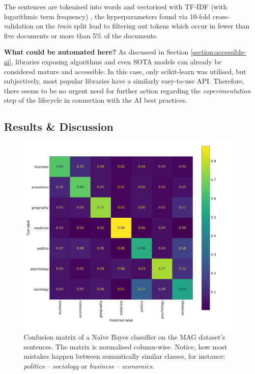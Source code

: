 The sentences are tokenised into words and vectorised with TF-IDF (with logarithmic term frequency) \cite{buckley1985implementation}, the hyperparameters found via 10-fold cross-validation on the \textit{train} split lead to filtering out tokens which occur in fewer than five documents or more than 5\% of the documents.

\begin{displayquote}
\textbf{What could be automated here?} As discussed in Section \ref{section:accessible-ai}, libraries exposing algorithms and even SOTA models can already be considered mature and accessible. In this case, only scikit-learn was utilised, but subjectively, most popular libraries have a similarly easy-to-use API. Therefore, there seems to be no urgent need for further action regarding the \textit{experimentation} step of the lifecycle in connection with the AI best practices.
\end{displayquote}

\subsection{Results \& Discussion}

\begin{figure}
    \centering
    \includegraphics[width=0.9\linewidth]{figures/mag-confusion.png}
    \captionsetup{width=.9\linewidth}
    \caption{Confusion matrix of a Naïve Bayes classifier on the MAG dataset's sentences. The matrix is normalised column-wise. Notice, how most mistakes happen between semantically similar classes, for instance: \textit{politics} -- \textit{sociology} or \textit{business} -- \textit{economics}.}
    \label{fig:mag-confusion}
\end{figure}

